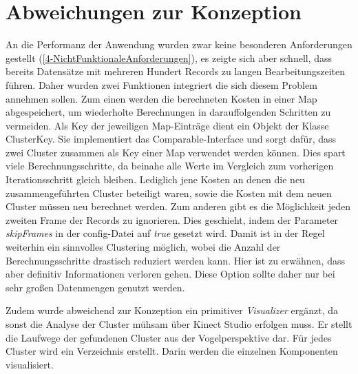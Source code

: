 \section{Abweichungen zur Konzeption}
\label{5-AbweichungenKonzeption}
An die Performanz der Anwendung wurden zwar keine besonderen Anforderungen gestellt
(\autoref{4-NichtFunktionaleAnforderungen}),
es zeigte sich aber schnell, dass bereits Datensätze mit mehreren Hundert Records zu langen Bearbeitungszeiten führen.
Daher wurden zwei Funktionen integriert die sich diesem Problem annehmen sollen.
Zum einen werden die berechneten Kosten in einer Map abgespeichert,
um wiederholte Berechnungen in darauffolgenden Schritten zu vermeiden.
Als Key der jeweiligen Map-Einträge dient ein Objekt der Klasse ClusterKey.
Sie implementiert das Comparable-Interface und sorgt dafür,
dass zwei Cluster zusammen als Key einer Map verwendet werden können.
Dies spart viele Berechnungsschritte,
da beinahe alle Werte im Vergleich zum vorherigen Iterationsschritt gleich bleiben.
Lediglich jene Kosten an denen die neu zusammengeführten Cluster beteiligt waren,
sowie die Kosten mit dem neuen Cluster müssen neu berechnet werden.
Zum anderen gibt es die Möglichkeit jeden zweiten Frame der Records zu ignorieren.
Dies geschieht, indem der Parameter \emph{skipFrames} in der config-Datei auf \emph{true} gesetzt wird.
Damit ist in der Regel weiterhin ein sinnvolles Clustering möglich,
wobei die Anzahl der Berechnungsschritte drastisch reduziert werden kann.
Hier ist zu erwähnen, dass aber definitiv Informationen verloren gehen.
Diese Option sollte daher nur bei sehr großen Datenmengen genutzt werden.

Zudem wurde abweichend zur Konzeption ein primitiver \emph{Visualizer} ergänzt,
da sonst die Analyse der Cluster mühsam über Kinect Studio erfolgen muss.
Er stellt die Laufwege der gefundenen Cluster aus der Vogelperspektive dar.
Für jedes Cluster wird ein Verzeichnis erstellt.
Darin werden die einzelnen Komponenten visualisiert.
